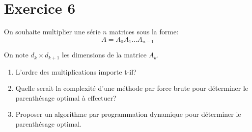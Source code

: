 \documentclass[a4paper,10pt]{article}
\begin{document}

\section*{Exercice 6}

On souhaite multiplier une série $n$ matrices sous la forme: $$A = A_0 A_1 ... A_{n-1}$$

On note $d_k \times d_{k+1}$ les dimensions de la matrice $A_k$.

\begin{enumerate}
\item L'ordre des multiplications importe t-il?
\item Quelle serait la complexité d'une méthode par force brute pour déterminer le parenthésage optimal à effectuer?
\item Proposer un algorithme par programmation dynamique pour déterminer le parenthésage optimal.
\end{enumerate}








\end{document}
